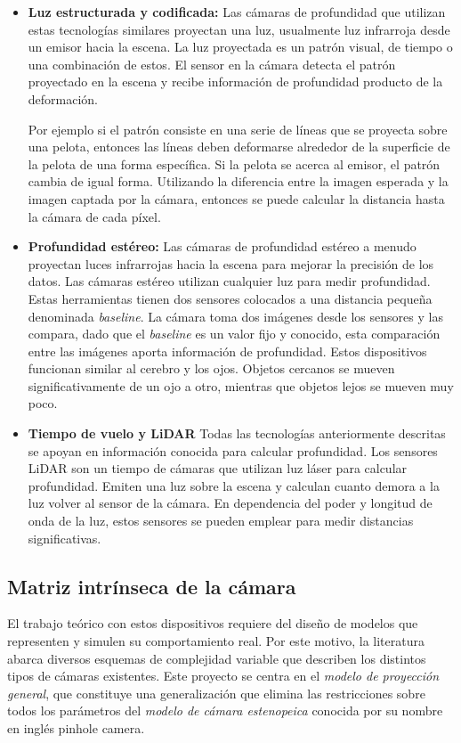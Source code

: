 \begin{itemize}
	\item \textbf{Luz estructurada y codificada:} Las cámaras de profundidad que utilizan estas tecnologías similares proyectan una luz, usualmente luz infrarroja desde un emisor hacia la escena. La luz proyectada es un patrón visual, de tiempo o una combinación de estos. El sensor en la cámara detecta el patrón proyectado en la escena y recibe información de profundidad producto de la deformación. 
	
	Por ejemplo si el patrón consiste en una serie de líneas que se proyecta sobre una pelota, entonces las líneas deben deformarse alrededor de la superficie de la pelota de una forma específica. Si la pelota se acerca al emisor, el patrón cambia de igual forma. Utilizando la diferencia entre la imagen esperada y la imagen captada por la cámara, entonces se puede calcular la distancia hasta la cámara de cada píxel.
	
	\item \textbf{Profundidad estéreo:} Las cámaras de profundidad estéreo a menudo proyectan luces infrarrojas hacia la escena para mejorar la precisión de los datos. Las cámaras estéreo utilizan cualquier luz para medir profundidad. Estas herramientas tienen dos sensores colocados a una distancia pequeña denominada \textit{baseline}. La cámara toma dos imágenes desde los sensores y las compara, dado que el \textit{baseline} es un valor fijo y conocido, esta comparación entre las imágenes aporta información de profundidad. Estos dispositivos funcionan similar al cerebro y los ojos. Objetos cercanos se mueven significativamente de un ojo a otro, mientras que objetos lejos se mueven muy poco. 
	
	\item \textbf{Tiempo de vuelo y LiDAR} Todas las tecnologías anteriormente descritas se apoyan en información conocida para calcular profundidad. Los sensores LiDAR son un tiempo de cámaras que utilizan luz láser para calcular profundidad. Emiten una luz sobre la escena y calculan cuanto demora a la luz volver al sensor de la cámara. En dependencia del poder y longitud de onda de la luz, estos sensores se pueden emplear para medir distancias significativas.
\end{itemize}
\subsection{Matriz intrínseca de la cámara}

El trabajo teórico con estos dispositivos requiere del diseño de modelos que representen y simulen su comportamiento real. Por este motivo, la literatura abarca diversos esquemas de complejidad variable que describen los distintos tipos de cámaras existentes. Este proyecto se centra en el \textit{modelo de proyección general}, que constituye una generalización que elimina las restricciones sobre todos los parámetros del \textit{modelo de cámara estenopeica} conocida por su nombre en inglés pinhole camera.


